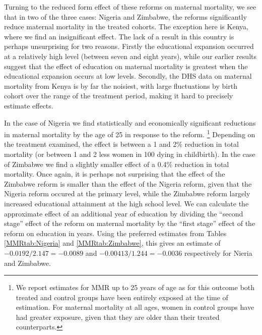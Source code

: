 \documentclass{article}[12pt,subeqn]
\begin{document}
\begin{spacing}{1.4}
Turning to the reduced form effect of these reforms on maternal mortality, we see 
that in two of the three cases: Nigeria and Zimbabwe, the reforms significantly 
reduce maternal mortality in the treated cohorts. The exception here is Kenya,
where we find an insignificant effect.  The lack of a result in this country is
perhaps unsurprising for two reasons.  Firstly the educational expansion occurred
at a relatively high level (between seven and eight years), while our earlier
results suggest that the effect of education on maternal mortality is greatest
when the educational expansion occurs at low levels.  Secondly, the DHS data on
maternal mortality from Kenya is by far the noisiest, with large fluctuations by
birth cohort over the range of the treatment period, making it hard to precisely
estimate effects.

In the case of Nigeria we find statistically and economically significant 
reductions in maternal mortality by the age of 25 in response to the reform.%
\footnote{We report estimates for MMR up to 25 years of age as for this outcome
  both treated and control groups have been entirely exposed at the time of
  estimation.  For maternal mortality at all ages, women in control groups
  have had greater exposure, given that they are older than their treated
  counterparts.}
Depending on the treatment examined, the effect is between a 1 and 2\% reduction 
in total mortality (or between 1 and 2 less women in 100 dying in childbirth).  
In the case of Zimbabwe we find a slightly smaller effect of a 0.4\% reduction in 
total mortality.  Once again, it is perhaps not surprising that the effect of the 
Zimbabwe reform is smaller than the effect of the Nigeria reform, given that the 
Nigeria reform occured at the primary level, while the Zimbabwe reform largely 
increased educational attainment at the high school level.  We can calculate the 
approximate effect of an additional year of education by dividing the 
``second stage'' effect of the reform on maternal mortality by the ``first stage'' 
effect of the reform on education in years.  Using the preferred estimates from 
Tables \ref{MMRtab:Nigeria} and \ref{MMRtab:Zimbabwe}, this gives an estimate of 
$-0.0192/2.147=-0.0089$ and $-0.00413/1.244=-0.0036$ respectively for Nieria and
Zimbabwe.


\end{spacing}
\end{document}
